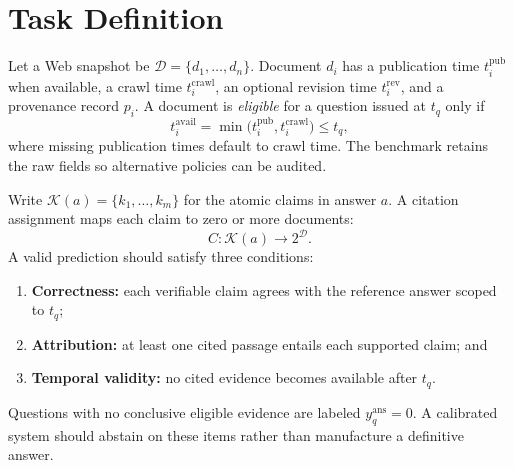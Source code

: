 \section{Task Definition}
\label{sec:task}

Let a Web snapshot be $\mathcal{D}=\{d_1,\ldots,d_n\}$.  Document $d_i$ has a
publication time $t_i^{\mathrm{pub}}$ when available, a crawl time
$t_i^{\mathrm{crawl}}$, an optional revision time $t_i^{\mathrm{rev}}$, and a
provenance record $p_i$.  A document is \emph{eligible} for a question issued at
$t_q$ only if
\begin{equation}
  t_i^{\mathrm{avail}} =
  \min\bigl(t_i^{\mathrm{pub}},t_i^{\mathrm{crawl}}\bigr) \leq t_q,
  \label{eq:eligibility}
\end{equation}
where missing publication times default to crawl time.  The benchmark retains
the raw fields so alternative policies can be audited.

Write $\mathcal{K}(a)=\{k_1,\ldots,k_m\}$ for the atomic claims in answer $a$.
A citation assignment maps each claim to zero or more documents:
\begin{equation}
  C: \mathcal{K}(a)\longrightarrow 2^{\mathcal{D}}.
  \label{eq:citation-map}
\end{equation}
A valid prediction should satisfy three conditions:

\begin{enumerate}
  \item \textbf{Correctness:} each verifiable claim agrees with the reference
    answer scoped to $t_q$;
  \item \textbf{Attribution:} at least one cited passage entails each supported
    claim; and
  \item \textbf{Temporal validity:} no cited evidence becomes available after
    $t_q$.
\end{enumerate}

Questions with no conclusive eligible evidence are labeled
$y_q^{\mathrm{ans}}=0$.  A calibrated system should abstain on these items rather
than manufacture a definitive answer.

